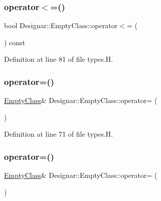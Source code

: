 \subsubsection{\texorpdfstring{operator$<$=()}{operator<=()}}
{\footnotesize\ttfamily bool Designar\+::\+Empty\+Class\+::operator$<$= (\begin{DoxyParamCaption}\item[{const \hyperlink{class_designar_1_1_empty_class}{Empty\+Class} \&}]{ }\end{DoxyParamCaption}) const\hspace{0.3cm}{\ttfamily [inline]}}



Definition at line 81 of file types.\+H.

\mbox{\label{class_designar_1_1_empty_class_ac40f40d89e1823d95f5441e037d4212a}} 
\subsubsection{\texorpdfstring{operator=()}{operator=()}\hspace{0.1cm}{\footnotesize\ttfamily [1/2]}}
{\footnotesize\ttfamily \hyperlink{class_designar_1_1_empty_class}{Empty\+Class}\& Designar\+::\+Empty\+Class\+::operator= (\begin{DoxyParamCaption}\item[{const \hyperlink{class_designar_1_1_empty_class}{Empty\+Class} \&}]{ }\end{DoxyParamCaption})\hspace{0.3cm}{\ttfamily [inline]}}



Definition at line 71 of file types.\+H.

\mbox{\label{class_designar_1_1_empty_class_a41efe51c730deccac172173c27e4f9a7}} 
\subsubsection{\texorpdfstring{operator=()}{operator=()}\hspace{0.1cm}{\footnotesize\ttfamily [2/2]}}
{\footnotesize\ttfamily \hyperlink{class_designar_1_1_empty_class}{Empty\+Class}\& Designar\+::\+Empty\+Class\+::operator= (\begin{DoxyParamCaption}\item[{\hyperlink{class_designar_1_1_empty_class}{Empty\+Class} \&\&}]{ }\end{DoxyParamCaption})\hspace{0.3cm}{\ttfamily [inline]}}



